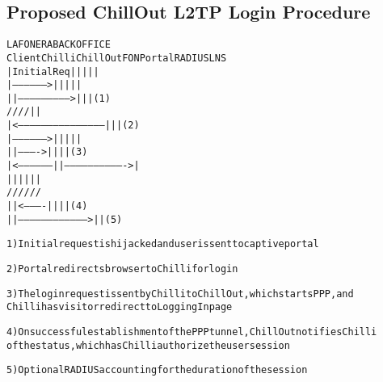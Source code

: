 \subsection{Proposed ChillOut L2TP Login Procedure}
\begin{alltt}\small
                        LA FONERA                  BACK OFFICE   
Client             Chilli     ChillOut      FON Portal   RADIUS  LNS
  | Initial Req      |           |               |         |      |
  |----------------->|           |               |         |      |
  |                  |-------------------------->|         |      |   (1)
  /                  /           /               /         |      |   
  |<---------------------------------------------|         |      |   (2)   
  |----------------->|           |               |         |      |
  |                  |---------->|               |         |      |   (3)
  |<-----------------|           |------------------------------->|
  |                  |           |               |         |      |
  /                  /           /               /         /      /
  |                  |<----------|               |         |      |   (4)
  |                  |------------------------------------>|      |   (5)

1) Initial request is hijacked and user is sent to captive portal

2) Portal redirects browser to Chilli for login

3) The login request is sent by Chilli to ChillOut, which starts PPP, and
   Chilli has visitor redirect to Logging In page

4) On successful establishment of the PPP tunnel, ChillOut notifies Chilli
   of the status, which has Chilli authorize the user session

5) Optional RADIUS accounting for the duration of the session
\end{alltt}
